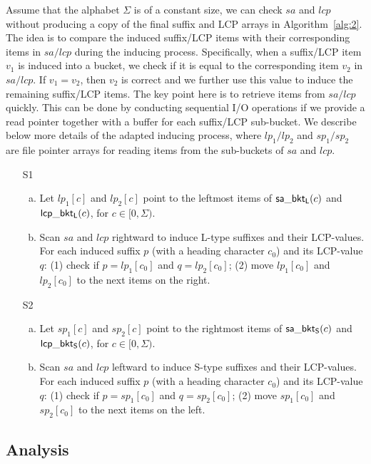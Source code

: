 \documentclass[10pt,journal,compsoc]{IEEEtran}
\begin{document}
Assume that the alphabet $\Sigma$ is of a constant size, we can check $sa$ and $lcp$ without producing a copy of the final suffix and LCP arrays in Algorithm~\ref{alg:2}. The idea is to compare the induced suffix/LCP items with their corresponding items in $sa/lcp$ during the inducing process. Specifically, when a suffix/LCP item $v_1$ is induced into a bucket, we check if it is equal to the corresponding item $v_2$ in $sa/lcp$. If $v_1 = v_2$, then $v_2$ is correct and we further use this value to induce the remaining suffix/LCP items. The key point here is to retrieve items from $sa/lcp$ quickly. This can be done by conducting sequential I/O operations if we provide a read pointer together with a buffer for each suffix/LCP sub-bucket. We describe below more details of the adapted inducing process, where $lp_1/lp_2$ and $sp_1/sp_2$ are file pointer arrays for reading items from the sub-buckets of $sa$ and $lcp$.

\begin{enumerate}
	\item [S1]
	\begin{enumerate}[(a)]
		\item 
		Let $lp_1[c]$ and $lp_2[c]$ point to the leftmost items of ${\sf sa\_bkt_L}(c)$ and ${\sf lcp\_bkt_L}(c)$, for $c \in [0, \Sigma)$.
		\item 
		Scan $sa$ and $lcp$ rightward to induce L-type suffixes and their LCP-values. For each induced suffix $p$ (with a heading character $c_0$) and its LCP-value $q$: (1) check if $p = lp_1[c_0]$ and $q = lp_2[c_0]$; (2) move $lp_1[c_0]$ and $lp_2[c_0]$ to the next items on the right.
	\end{enumerate}
	\item [S2]
	\begin{enumerate}[(a)]
		\item 	
		Let $sp_1[c]$ and $sp_2[c]$ point to the rightmost items of ${\sf sa\_bkt_S}(c)$ and ${\sf lcp\_bkt_S}(c)$, for $c \in [0, \Sigma)$.
		\item 	
		Scan $sa$ and $lcp$ leftward to induce S-type suffixes and their LCP-values. For each induced suffix $p$ (with a heading character $c_0$) and its LCP-value $q$: (1) check if $p = sp_1[c_0]$ and $q = sp_2[c_0]$; (2) move $sp_1[c_0]$ and $sp_2[c_0]$ to the next items on the left.
	\end{enumerate}
\end{enumerate}

\subsection{Analysis} \label{sec:method2:analysis}
\end{document}
